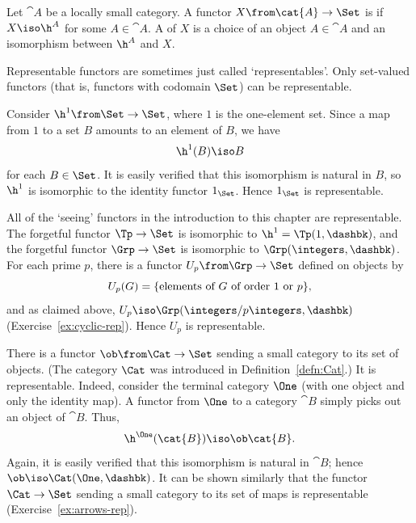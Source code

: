\begin{defn}
\label{defn:repr-func}
Let $\cat{A}$ be a locally small category.  A functor $X\from \cat{A} \to
\Set$ is %
%
%
if $X \iso \h^A$ for some $A \in \cat{A}$.
A %
%
%
of $X$ is a choice of an object $A \in \cat{A}$ and an isomorphism between
$\h^A$ and $X$.
\end{defn}
% 
Representable functors are sometimes just called `representables'.  Only
set-valued%
%
%
%
functors (that is, functors with codomain $\Set$) can be representable.

\begin{example}        
\label{eg:co-reps-id-Set}
Consider $\h^1\from \Set \to \Set$, where $1$ is the one-element set.
Since a map from $1$ to a set $B$ amounts to an element of $B$, we have
\[
\h^1(B) \iso B
\]
for each $B \in \Set$.  It is easily verified that this isomorphism is
natural in $B$, so $\h^1$ is isomorphic to the identity functor $1_\Set$.
Hence $1_\Set$ is representable.
\end{example}

\begin{example}
\label{eg:co-reps-seeing}
All of the `seeing'%
%
%
functors in the introduction to this chapter are representable.  The
forgetful%
%
%
functor $\Tp \to \Set$ is isomorphic to $\h^1 = \Tp(1, \dashbk)$, and the
forgetful functor $\Grp \to \Set$ is isomorphic to $\Grp(\integers,
\dashbk)$.  For each prime $p$, there is a functor $U_p\from \Grp \to \Set$
defined on objects by
\[
U_p(G) = 
\{\text{elements of }G \text{ of order } 1 \text{ or } p \},
%
\index{group!order of element of}
%
\]
and as claimed above, $U_p \iso \Grp(\integers/p\integers, \dashbk)$
(Exercise~\ref{ex:cyclic-rep}).  Hence $U_p$ is representable.
\end{example}

\begin{example}
There is a functor $\ob\from \Cat \to \Set$ sending a small category to its
set%
%
% 
of objects.  (The category $\Cat$ was introduced in
Definition~\ref{defn:Cat}.) It is representable.  Indeed, consider the
terminal category $\One$ (with one object and only the identity map).  A
functor from $\One$ to a category $\cat{B}$ simply picks out an object of
$\cat{B}$.  Thus,
\[
\h^\One(\cat{B}) \iso \ob\cat{B}.
\]
Again, it is easily verified that this isomorphism is natural in $\cat{B}$;
hence $\ob \iso \Cat(\One, \dashbk)$.  It can be shown similarly that the
functor $\Cat \to \Set$ sending a small category to its set of maps is
representable (Exercise~\ref{ex:arrows-rep}).  
\end{example}

